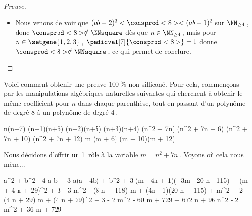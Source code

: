 \begin{proof}[Preuve]
    \begin{itemize}
    	\item Nous venons de voir que $( a b - 2)^2 < \consprod<8> < ( a b - 1)^2$ sur $\NN_{\geq 4}$\,, donc $\consprod<8> \notin \NNsquare$ dès que $n \in \NN_{\geq 4}$\,, mais pour $n \in \setgene{1, 2, 3}$\,, $\padicval[7]{\consprod<8>} =1$ donne $\consprod<8> \notin \NNsquare$\,, ce qui permet de conclure.
		\qedhere
    \end{itemize}
\end{proof}
	

\begin{remark} \label{no-silicon}
	Voici comment obtenir une preuve $\qty{100}{\percent}$ non silliconé.
	Pour cela, commençons par les manipulations algébriques naturelles suivantes qui cherchent à obtenir le même coefficient pour $n$ dans chaque parenthèse, tout en passant d'un polynôme de degré $8$ à un polynôme de degré $4$\,.
    
    \medskip
    
    \begin{stepcalc}[style = sar]
    \explnext{}
    	n(n+7) \cdot (n+1)(n+6) \cdot (n+2)(n+5) \cdot (n+3)(n+4)
    \explnext{}
    	(n^2 + 7n) \cdot (n^2 + 7n + 6) \cdot (n^2 + 7n + 10) \cdot (n^2 + 7n + 12)
    	m (m + 6) (m + 10)(m + 12)
    \end{stepcalc}
    
    \medskip
    Nous décidons d'offrir un 1\ier\ rôle à la variable $m = n^2 + 7n$\,. Voyons où cela nous mène...
    
	\medskip
	\begin{stepcalc}[style = ar*, ope={=}]
    	a^2 + b^2 - 4 a b + 3
    \explnext{}
    	a(a - 4b) + b^2 + 3
    	(m - 4n + 1)(- 3m - 20 n - 115) 
		+
		(m + 4 n + 29)^2
		+
		3
    \explnext{}
    	- 3 m^2 - (8 n + 118) m + (4n - 1)(20 n + 115)
		+
		m^2 + 2 (4 n + 29) m
		+
		(4 n + 29)^2
		+
		3
    \explnext{}
    	- 2 m^2
		- 60 m 
		+
		729 + 672 n + 96 n^2
    	- 2 m^2 + 36 m + 729
    \end{stepcalc}
\end{remark}
